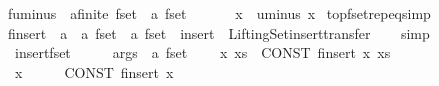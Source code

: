 \begin{isabellebody}
\isamarkupfalse%
\ fuminus\ {\isacharcolon}{\isacharcolon}\ {\isachardoublequoteopen}{\isacharprime}a{\isacharcolon}{\isacharcolon}finite\ fset\ {\isasymRightarrow}\ {\isacharprime}a\ fset{\isachardoublequoteclose}\ {\isacharparenleft}{\isachardoublequoteopen}{\isacharbar}{\isacharminus}{\isacharbar}\ {\isacharunderscore}{\isachardoublequoteclose}\ {\isacharbrackleft}{}{}{\isacharbrackright}\ {}{}{\isacharparenright}\ \ {\isachardoublequoteopen}{\isacharbar}{\isacharminus}{\isacharbar}\ x\ {\isasymequiv}\ uminus\ x{\isachardoublequoteclose}\isanewline
\isanewline
{}\isamarkupfalse%
\ top{\isacharunderscore}fset{\isachardot}rep{\isacharunderscore}eq{\isacharbrackleft}simp{\isacharbrackright}%
\isadelimdocument
%
\endisadelimdocument
%
\isatagdocument
%
\isamarkuptrue%
%
\endisatagdocument
{\isafolddocument}%
%
\isadelimdocument
%
\endisadelimdocument
{}\isamarkupfalse%
\ finsert\ {\isacharcolon}{\isacharcolon}\ {\isachardoublequoteopen}{\isacharprime}a\ {\isasymRightarrow}\ {\isacharprime}a\ fset\ {\isasymRightarrow}\ {\isacharprime}a\ fset{\isachardoublequoteclose}\ \ insert\ \ Lifting{\isacharunderscore}Set{\isachardot}insert{\isacharunderscore}transfer\isanewline
%
\isadelimproof
\ \ %
\endisadelimproof
%
\isatagproof
{}\isamarkupfalse%
\ simp%
\endisatagproof
{\isafoldproof}%
%
\isadelimproof
\isanewline
%
\endisadelimproof
\isanewline
{}\isamarkupfalse%
\isanewline
\ \ {\isachardoublequoteopen}{\isacharunderscore}insert{\isacharunderscore}fset{\isachardoublequoteclose}\ \ \ \ \ {\isacharcolon}{\isacharcolon}\ {\isachardoublequoteopen}args\ {\isacharequal}{\isachargreater}\ {\isacharprime}a\ fset{\isachardoublequoteclose}\ \ {\isacharparenleft}{\isachardoublequoteopen}{\isacharbraceleft}{\isacharbar}{\isacharparenleft}{\isacharunderscore}{\isacharparenright}{\isacharbar}{\isacharbraceright}{\isachardoublequoteclose}{\isacharparenright}\isanewline
\isanewline
{}\isamarkupfalse%
\isanewline
\ \ {\isachardoublequoteopen}{\isacharbraceleft}{\isacharbar}x{\isacharcomma}\ xs{\isacharbar}{\isacharbraceright}{\isachardoublequoteclose}\ {\isacharequal}{\isacharequal}\ {\isachardoublequoteopen}CONST\ finsert\ x\ {\isacharbraceleft}{\isacharbar}xs{\isacharbar}{\isacharbraceright}{\isachardoublequoteclose}\isanewline
\ \ {\isachardoublequoteopen}{\isacharbraceleft}{\isacharbar}x{\isacharbar}{\isacharbraceright}{\isachardoublequoteclose}\ \ \ \ \ {\isacharequal}{\isacharequal}\ {\isachardoublequoteopen}CONST\ finsert\ x\ {\isacharbraceleft}{\isacharbar}{\isacharbar}{\isacharbraceright}{\isachardoublequoteclose}\isanewline

\end{isabellebody}
